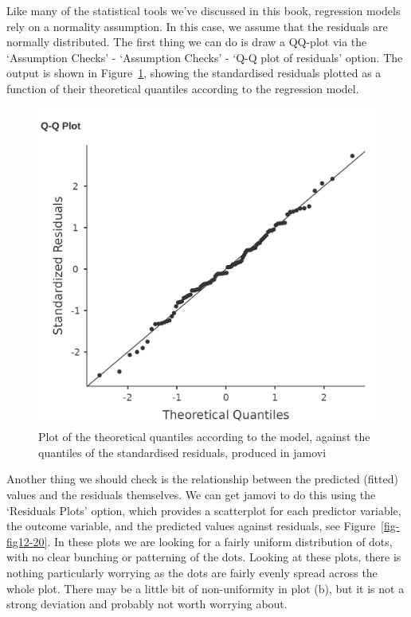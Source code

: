 \documentclass[
  a4paper,
]{book}
\begin{document}
Like many of the statistical tools we've discussed in this book,
regression models rely on a normality assumption. In this case, we
assume that the residuals are normally distributed. The first thing we
can do is draw a QQ-plot via the `Assumption Checks' - `Assumption
Checks' - `Q-Q plot of residuals' option. The output is shown in
Figure~\ref{fig-fig12-19}, showing the standardised residuals plotted as
a function of their theoretical quantiles according to the regression
model.

\begin{figure}

\includegraphics[width=1\textwidth,height=\textheight]{images/fig12-19.png} \hfill{}

\caption{\label{fig-fig12-19}Plot of the theoretical quantiles according
to the model, against the quantiles of the standardised residuals,
produced in jamovi}

\end{figure}

Another thing we should check is the relationship between the predicted
(fitted) values and the residuals themselves. We can get jamovi to do
this using the `Residuals Plots' option, which provides a scatterplot
for each predictor variable, the outcome variable, and the predicted
values against residuals, see Figure~\ref{fig-fig12-20}. In these plots
we are looking for a fairly uniform distribution of dots, with no clear
bunching or patterning of the dots. Looking at these plots, there is
nothing particularly worrying as the dots are fairly evenly spread
across the whole plot. There may be a little bit of non-uniformity in
plot (b), but it is not a strong deviation and probably not worth
worrying about.
\end{document}
